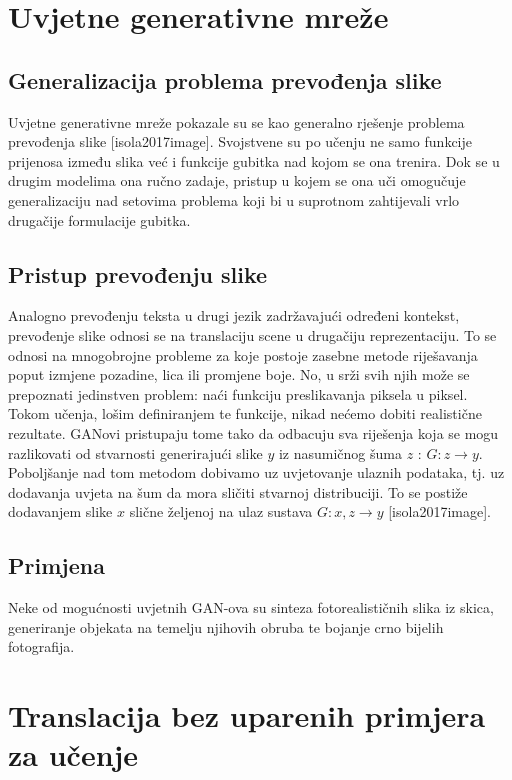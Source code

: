 \documentclass[lmodern, utf8, seminar]{fer}
\begin{document}
\chapter{Uvjetne generativne mreže}
\section{Generalizacija problema prevođenja slike}
Uvjetne generativne mreže pokazale su se kao generalno rješenje problema prevođenja slike [isola2017image]. Svojstvene su po učenju ne samo funkcije prijenosa između slika već i funkcije gubitka nad kojom se ona trenira.
Dok se u drugim modelima ona ručno zadaje, pristup u kojem se ona uči omogučuje generalizaciju nad setovima problema koji bi u suprotnom zahtijevali vrlo drugačije formulacije gubitka.
\newline

\section{Pristup prevođenju slike}
Analogno prevođenju teksta u drugi jezik zadržavajući određeni kontekst, prevođenje slike odnosi se na translaciju scene u drugačiju reprezentaciju. To se odnosi na mnogobrojne probleme za koje postoje zasebne metode riješavanja poput izmjene pozadine, lica ili promjene boje. No, u srži svih njih može se prepoznati jedinstven problem: naći funkciju preslikavanja piksela u piksel. Tokom učenja, lošim definiranjem te funkcije, nikad nećemo dobiti realistične rezultate. GANovi pristupaju tome tako da odbacuju sva riješenja koja se mogu razlikovati od stvarnosti generirajući slike $y$ iz nasumičnog šuma $z$ : $G: z \rightarrow y$. Poboljšanje nad tom metodom dobivamo uz uvjetovanje ulaznih podataka, tj. uz dodavanja uvjeta na šum da mora sličiti stvarnoj distribuciji. To se postiže dodavanjem slike $x$ slične željenoj na ulaz sustava $G: {x,z} \rightarrow y$ [isola2017image].

\section{Primjena}
Neke od mogućnosti uvjetnih GAN-ova su sinteza fotorealističnih slika iz skica, generiranje objekata na temelju njihovih obruba te bojanje crno bijelih fotografija.



\chapter{Translacija bez uparenih primjera za učenje}
\end{document}
